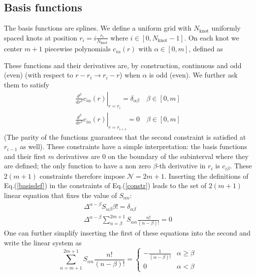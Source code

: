 \documentclass{revtex4}
\newcommand{\Nk}{N_\text{knot}}
\begin{document}
\subsection*{Basis functions}
The basis functions are splines. We define a uniform grid 
with $\Nk$ uniformly spaced knots at position $r_i=i\frac{r_c}{\Nk}$ 
where $i\in[0,\Nk-1]$. On each knot we center $m+1$ piecewise polynomials
$c_{i\alpha}(r)$ with $\alpha\in[0,m]$, defined as
\vskip 3mm
\begin{center}
\end{center}
\vskip 3mm
These functions and their derivatives are, by construction, continuous and odd (even)
(with respect to $r-r_i\rightarrow r_i-r$) when $\alpha$ is odd (even).
We further ask them to satisfy
\begin{eqnarray}
\left.\frac{d^\beta}{dr^\beta} c_{i\alpha}(r)\right|_{r=r_i}=
\delta_{\alpha\beta} \quad \beta\in[0,m]\\
\left.\frac{d^{\beta}}{dr^{\beta}} c_{i\alpha}(r)\right|_{r=r_{i+1}}=0\quad \beta\in[0,m]
\label{constr}
\end{eqnarray}
(The parity of the functions guarantees that the second constraint is satisfied
at $r_{i-1}$ as well). These constraints have a simple interpretation: the basis functions
and their first $m$ derivatives are $0$ on the boundary of the subinterval where they
are defined; the only function to have a non zero $\beta$-th derivative in $r_i$ is $c_{i\beta}$.
These $2(m+1)$ constraints therefore impose $\mathcal{N}=2m+1$. 
Inserting the definitions of Eq.(\ref{basisdef}) in the constraints of Eq.(\ref{constr})
leads to the set of $2(m+1)$ linear equation that fixes the value of $S_{\alpha n}$: 
\begin{eqnarray}
\Delta^{\alpha-\beta} S_{\alpha\beta} \beta!=\delta_{\alpha\beta}
\label{Smatrix1}\\
\Delta^{\alpha-\beta}\sum_{n=\beta}^{2m+1} S_{\alpha n} \frac{n!}{(n-\beta)!}=0
\end{eqnarray}
One can further simplify inserting the first of these equations into the second and write
the linear system as
\begin{equation}
\sum_{n=m+1}^{2m+1} S_{\alpha n} \frac{n!}{(n-\beta)!}=\begin{cases}
-\frac{1}{(\alpha-\beta)!}& \alpha\ge \beta \\
0 & \alpha < \beta
\end{cases}
\label{Smatrix2}
\end{equation}
\end{document}
